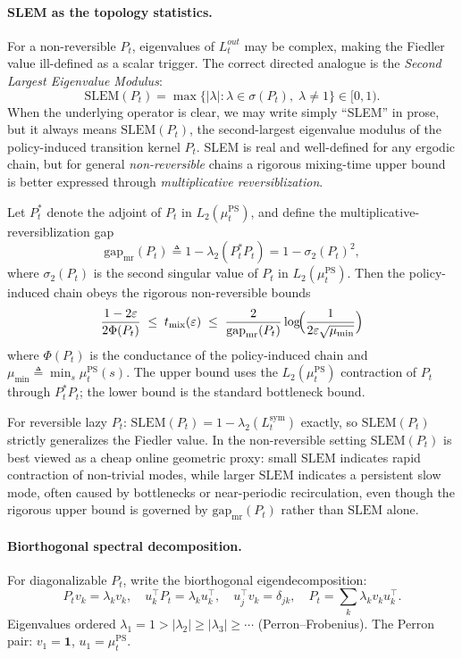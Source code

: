 \documentclass[10pt,a4paper]{article}
\begin{document}
\paragraph{SLEM as the topology statistics.}
For a non-reversible $P_t$, eigenvalues of $L^{out}_t$ may be complex, making
the Fiedler value ill-defined as a scalar trigger.  The correct directed analogue is
the \textit{Second Largest Eigenvalue Modulus}:
\[
  \mathrm{SLEM}(P_t) = \max\bigl\{|\lambda| : \lambda \in \sigma(P_t),\; \lambda \neq 1\bigr\} \in [0,1).
\]
When the underlying operator is clear, we may write simply ``SLEM'' in prose, but it always means
$\mathrm{SLEM}(P_t)$, the second-largest eigenvalue modulus of the policy-induced transition kernel
$P_t$.
SLEM is real and well-defined for any ergodic chain, but for general \emph{non-reversible}
chains a rigorous mixing-time upper bound is better expressed through
\emph{multiplicative reversiblization}.

Let $P_t^*$ denote the adjoint of $P_t$ in $L_2(\mu_t^{\mathrm{PS}})$, and define the
multiplicative-reversiblization gap
\[
  \mathrm{gap}_{\mathrm{mr}}(P_t) \triangleq 1 - \lambda_2(P_t^*P_t) = 1 - \sigma_2(P_t)^2,
\]
where $\sigma_2(P_t)$ is the second singular value of $P_t$ in $L_2(\mu_t^{\mathrm{PS}})$.
Then the policy-induced chain obeys the rigorous non-reversible bounds
\[
  \frac{1-2\varepsilon}{2\Phi(P_t)} \;\leq\; t_{\mathrm{mix}}(\varepsilon) \;\leq\;
  \frac{2}{\mathrm{gap}_{\mathrm{mr}}(P_t)} \log\!\Bigl(\frac{1}{2\varepsilon\sqrt{\mu_{\min}}}\Bigr)
\]
where $\Phi(P_t)$ is the conductance of the policy-induced chain and $\mu_{\min} \triangleq \min_s \mu_t^{\mathrm{PS}}(s)$.  The upper bound
uses the $L_2(\mu_t^{\mathrm{PS}})$ contraction of $P_t$ through $P_t^*P_t$; the lower bound is the
standard bottleneck bound.

For reversible lazy $P_t$: $\mathrm{SLEM}(P_t) = 1-\lambda_2(L_t^{\mathrm{sym}})$ exactly,
so $\mathrm{SLEM}(P_t)$ strictly generalizes the Fiedler value.  In the non-reversible setting $\mathrm{SLEM}(P_t)$ is
best viewed as a cheap online geometric proxy: small $\mathrm{SLEM}$ indicates rapid
contraction of non-trivial modes, while larger $\mathrm{SLEM}$ indicates a persistent
slow mode, often caused by bottlenecks or near-periodic recirculation, even though the
rigorous upper bound is governed by $\mathrm{gap}_{\mathrm{mr}}(P_t)$ rather than $\mathrm{SLEM}$ alone.


\paragraph{Biorthogonal spectral decomposition.}
For diagonalizable $P_t$, write the biorthogonal eigendecomposition:
\[
  P_t v_k = \lambda_k v_k, \quad u_k^\top P_t = \lambda_k u_k^\top,
  \quad u_j^\top v_k = \delta_{jk}, \quad P_t = \sum_k \lambda_k v_k u_k^\top.
\]
Eigenvalues ordered $\lambda_1=1 > |\lambda_2| \geq |\lambda_3| \geq \cdots$ (Perron--Frobenius).
The Perron pair: $v_1 = \mathbf{1}$, $u_1 = \mu^{\mathrm{PS}}_t$.
\end{document}
